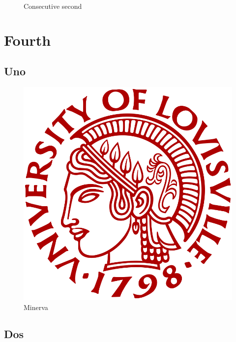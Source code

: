 \documentclass{uoflthesis} %
\begin{document}
\begin{figure}
\centering
{}
\caption{Consecutive second}
\end{figure}

\lipsum

\chapter{Fourth}

\section{Uno}

\lipsum

\begin{figure}
\centering
\includegraphics[scale=0.3]{uofl.png}
\caption{Minerva}
\end{figure}

\lipsum

\section{Dos}

\lipsum[1-150]
\end{document}
